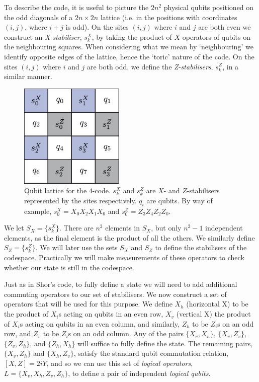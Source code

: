 To describe the code, it is useful to picture the $2n^2$ physical qubits positioned on the odd diagonals of a $2n \times 2n$ lattice (i.e. in the positions with coordinates $(i,j)$, where $i+j$ is odd). On the sites $(i, j)$ where $i$ and $j$ are both even we construct an \textit{X-stabiliser}, $s^X_{k}$, by taking the product of $X$ operators of qubits on the neighbouring squares. When considering what we mean by `neighbouring' we identify opposite edges of the lattice, hence the `toric' nature of the code. On the sites $(i,j)$ where $i$ and $j$ are both odd, we define the \textit{Z-stabilisers}, $s^Z_{k}$, in a similar manner.
\begin{figure}[htb]
  \begin{center}
    \includegraphics[width=5cm]{assets/4-code.pdf}
  \end{center}
  \caption{Qubit lattice for the $4$-code. $s_{k}^X$ and $s_{k}^Z$ are $X$- and $Z$-stabilisers represented by the sites respectively. $q_i$ are qubits. By way of example, $s_{0}^X = X_0 X_2 X_1 X_6$ and $s_{0}^Z = Z_3 Z_4 Z_2 Z_0$.}
  \label{4-code}
\end{figure}

We let $S_X = \{s^X_{k}\}$. There are $n^2$ elements in $S_X$, but only $n^2-1$ independent elements, as the final element is the product of all the others. We similarly define $S_Z = \{s^Z_{k}\}$. We will later use the sets $S_X$ and $S_Z$ to define the stabilisers of the codespace. Practically we will make measurements of these operators to check whether our state is still in the codespace. 

Just as in Shor's code, to fully define a state we will need to add additional commuting operators to our set of stabilisers. We now construct a set of operators that will be used for this purpose. We define $X_h$ (horizontal X) to be the product of $X_i$s acting on qubits in an even row, $X_v$ (vertical X) the product of $X_i$s acting on qubits in an even column, and similarly, $Z_h$ to be $Z_i$s on an odd row, and $Z_v$ to be $Z_i$s on an odd column. Any of the pairs $\{X_v, X_h\}$, $\{X_v, Z_v\}$, $\{Z_v, Z_h\}$, and $\{Z_h, X_h\}$ will suffice to fully define the state. The remaining pairs, $\{X_v, Z_h\}$ and $\{X_h, Z_v\}$, satisfy the standard qubit commutation relation, $[X, Z] = 2iY$, and so we can use this set of \textit{logical operators}, $L = \{X_v, X_h, Z_v , Z_h\}$, to define a pair of independent \textit{logical qubits}. 

